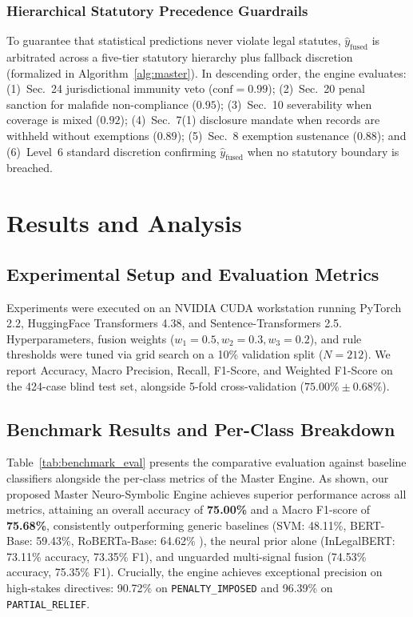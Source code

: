 \documentclass[conference]{IEEEtran}
\begin{document}
\subsubsection{Hierarchical Statutory Precedence Guardrails}
To guarantee that statistical predictions never violate legal statutes, $\hat{y}_{\text{fused}}$ is arbitrated across a five-tier statutory hierarchy plus fallback discretion (formalized in Algorithm~\ref{alg:master}). In descending order, the engine evaluates: (1)~Sec.~24 jurisdictional immunity veto ($\text{conf}=0.99$); (2)~Sec.~20 penal sanction for malafide non-compliance ($0.95$); (3)~Sec.~10 severability when coverage is mixed ($0.92$); (4)~Sec.~7(1) disclosure mandate when records are withheld without exemptions ($0.89$); (5)~Sec.~8 exemption sustenance ($0.88$); and (6)~Level~6 standard discretion confirming $\hat{y}_{\text{fused}}$ when no statutory boundary is breached.

\section{Results and Analysis}
\subsection{Experimental Setup and Evaluation Metrics}
Experiments were executed on an NVIDIA CUDA workstation running PyTorch 2.2, HuggingFace Transformers 4.38, and Sentence-Transformers 2.5. Hyperparameters, fusion weights ($w_1=0.5, w_2=0.3, w_3=0.2$), and rule thresholds were tuned via grid search on a 10\% validation split ($N=212$). We report Accuracy, Macro Precision, Recall, F1-Score, and Weighted F1-Score on the 424-case blind test set, alongside 5-fold cross-validation ($75.00\% \pm 0.68\%$).

\subsection{Benchmark Results and Per-Class Breakdown}
Table~\ref{tab:benchmark_eval} presents the comparative evaluation against baseline classifiers alongside the per-class metrics of the Master Engine.
As shown, our proposed Master Neuro-Symbolic Engine achieves superior performance across all metrics, attaining an overall accuracy of \textbf{75.00\%} and a Macro F1-score of \textbf{75.68\%}, consistently outperforming generic baselines (SVM: 48.11\%, BERT-Base: 59.43\%, RoBERTa-Base: 64.62\% \cite{liu2019roberta}), the neural prior alone (InLegalBERT: 73.11\% accuracy, 73.35\% F1), and unguarded multi-signal fusion (74.53\% accuracy, 75.35\% F1). Crucially, the engine achieves exceptional precision on high-stakes directives: 90.72\% on \texttt{PENALTY\_IMPOSED} and 96.39\% on \texttt{PARTIAL\_RELIEF}.
\end{document}
